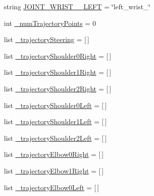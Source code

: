 \begin{DoxyCompactItemize}
\item 
string \mbox{\hyperlink{namespacesteering__interpolate__multiple__trajectories__and__print_a1fc7f18e44f7d2f5a138c789e088b83e}{J\+O\+I\+N\+T\+\_\+\+W\+R\+I\+S\+T\+\_\+\_\+\+L\+E\+FT}} = \char`\"{}left\+\_\+wrist\+\_\char`\"{}
\item 
int \mbox{\hyperlink{namespacesteering__interpolate__multiple__trajectories__and__print_a0d4474b80213f5089c46423325c57c95}{\+\_\+num\+Trajectory\+Points}} = 0
\item 
list \mbox{\hyperlink{namespacesteering__interpolate__multiple__trajectories__and__print_a565b90d2f2f24c7253af614061ddad9f}{\+\_\+trajectory\+Steering}} = \mbox{[}$\,$\mbox{]}
\item 
list \mbox{\hyperlink{namespacesteering__interpolate__multiple__trajectories__and__print_a31525c6644b6269f06f9f4cb7e0241ac}{\+\_\+trajectory\+Shoulder0\+Right}} = \mbox{[}$\,$\mbox{]}
\item 
list \mbox{\hyperlink{namespacesteering__interpolate__multiple__trajectories__and__print_a2b64212444f183bef95e9157f5f52551}{\+\_\+trajectory\+Shoulder1\+Right}} = \mbox{[}$\,$\mbox{]}
\item 
list \mbox{\hyperlink{namespacesteering__interpolate__multiple__trajectories__and__print_a678f18ab4a5bcd5580c74e488e71bdd7}{\+\_\+trajectory\+Shoulder2\+Right}} = \mbox{[}$\,$\mbox{]}
\item 
list \mbox{\hyperlink{namespacesteering__interpolate__multiple__trajectories__and__print_a17e01d8adf47863249743b5dace1ab01}{\+\_\+trajectory\+Shoulder0\+Left}} = \mbox{[}$\,$\mbox{]}
\item 
list \mbox{\hyperlink{namespacesteering__interpolate__multiple__trajectories__and__print_ae109fefba54da7423593442208221922}{\+\_\+trajectory\+Shoulder1\+Left}} = \mbox{[}$\,$\mbox{]}
\item 
list \mbox{\hyperlink{namespacesteering__interpolate__multiple__trajectories__and__print_a95e62574a291f93c55538e58bdb0cb8e}{\+\_\+trajectory\+Shoulder2\+Left}} = \mbox{[}$\,$\mbox{]}
\item 
list \mbox{\hyperlink{namespacesteering__interpolate__multiple__trajectories__and__print_a8086f3a259b143ff4b82a67d6274e6e6}{\+\_\+trajectory\+Elbow0\+Right}} = \mbox{[}$\,$\mbox{]}
\item 
list \mbox{\hyperlink{namespacesteering__interpolate__multiple__trajectories__and__print_a65af93e83047d9dd4e777ad5e5fe0af3}{\+\_\+trajectory\+Elbow1\+Right}} = \mbox{[}$\,$\mbox{]}
\item 
list \mbox{\hyperlink{namespacesteering__interpolate__multiple__trajectories__and__print_aa1676f36e115868ba031616743bd8c83}{\+\_\+trajectory\+Elbow0\+Left}} = \mbox{[}$\,$\mbox{]}

\end{DoxyCompactItemize}
